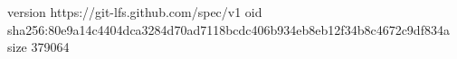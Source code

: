 version https://git-lfs.github.com/spec/v1
oid sha256:80e9a14c4404dca3284d70ad7118bcdc406b934eb8eb12f34b8c4672c9df834a
size 379064
